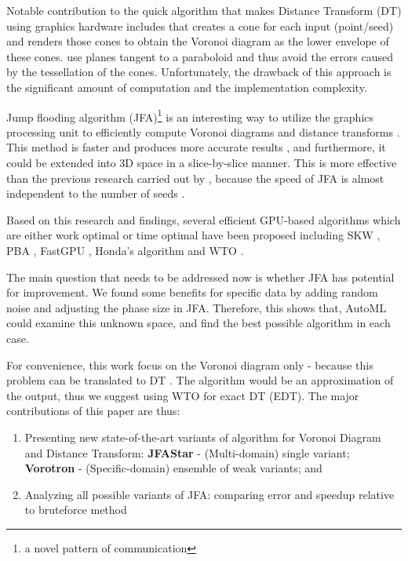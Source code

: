 \documentclass[format=acmsmall,screen,review,authordraft,nonacm]{acmart}
\newcommand{\ourjfasingle}{JFAStar}
\newcommand{\ourjfa}{Vorotron} %
\begin{document}
Notable contribution to the quick algorithm that makes Distance Transform (DT)
using graphics hardware includes \citep{hoff1999fast} that creates a cone for
each input (point/seed) and renders those cones to obtain the Voronoi diagram as the lower envelope of these cones.
\cite{fischer2006fast} use planes tangent to a paraboloid and thus avoid the errors caused by the tessellation of the cones.
Unfortunately, the drawback of this approach is the significant amount of computation and the implementation complexity.

Jump flooding algorithm (JFA)\footnote{a novel pattern of
communication} is an interesting way to utilize the graphics processing unit to
efficiently compute Voronoi diagrams and distance transforms
\cite{rong2006jump}. This method is faster and produces more accurate results
\cite{rong2007variants}, and furthermore, it could be extended into 3D space in a slice-by-slice manner.
This is more effective than the previous research carried out by
\citep{sud2006interactive}, because the speed of JFA is almost independent to the number of seeds \cite{rong2007variants}.

Based on this research and findings, several efficient GPU-based algorithms which are either
work optimal or time optimal have been proposed including
SKW \cite{schneider2009gpu}, PBA \cite{cao2010parallel}, FastGPU \cite{de2017fast}, Honda's algorithm \cite{honda2017simple} and
WTO \cite{manduhu2019work}.

The main question that needs to be addressed now is whether JFA has potential
for improvement. We found some benefits for specific data by adding random noise
and adjusting the phase size in JFA. Therefore, this shows that, AutoML could examine this
unknown space, and find the best possible algorithm in each case.

For convenience, this work focus on the Voronoi diagram only - because this problem can be translated to DT \cite{rong2006jump}.
The algorithm would be an approximation of the output, thus we suggest using WTO
\cite{manduhu2019work} for exact DT (EDT). The major contributions of this paper are thus:

\begin{enumerate}
	\item Presenting new state-of-the-art variants of algorithm for Voronoi
		Diagram and Distance Transform: \newline
		\textbf{\ourjfasingle} - (Multi-domain) single variant;
		\textbf{\ourjfa} - (Specific-domain) ensemble of weak variants; and
	\item Analyzing all possible variants of JFA: comparing error and speedup
		relative to bruteforce method
\end{enumerate}
\end{document}
